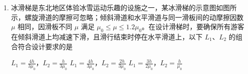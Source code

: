 \documentclass[\gkver]{gaokaozhenti}
\begin{document}
\begin{enumerate}
{根据闭合电路欧姆定律有此时间段的电流为

$I=\frac{E}{R}=\frac{B_0L^2}{Rt_0}$

在 $\frac{t_0}{2}$ 时磁感应强度为 $\frac{B_0}{2}$，此时安培力为

$F=BIL=\frac{B_0^2L^3}{2Rt_0}$

故 A 错误，B 正确；

C．由图可知在 $t=\frac{3t_0}{2}$ 时，磁场方向垂直纸面向外并逐渐增大，根据楞次定律可知产生顺时针方向的电流，再由左手定则可知金属棒受到的安培力方向竖直向上，故 C 正确；

D．由图可知在 $t=3t_0$ 时，磁场方向垂直纸面向外，金属棒向下掉的过程中磁通量增加，根据楞次定律可知金属棒中的感应电流方向向左，故 D 错误。

故选 BC。
}

\item
冰滑梯是东北地区体验冰雪运动乐趣的设施之一，某冰滑梯的示意图如图所示，螺旋滑道的摩擦可忽略；倾斜滑道和水平滑道与同一滑板间的动摩擦因数 $\mu$ 相同，因滑板不同 $\mu$ 满足 $\mu_0\leqslant\mu\leqslant1.2\mu_0$。在设计滑梯时，要确保所有游客在倾斜滑道上均减速下滑，且滑行结束时停在水平滑道上，以下 $L_1$、$L_2$ 的组合符合设计要求的是


{$L_1=\frac{4h}{3\mu_0}$，$L_2=\frac{h}{3\mu_0}$}
{$L_1=\frac{4h}{3\mu_0}$，$L_2=\frac{2h}{3\mu_0}$}
{$L_1=\frac{3h}{2\mu_0}$，$L_2=\frac{h}{\mu_0}$}

\end{enumerate}
\end{document}
